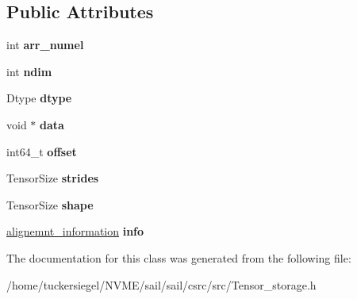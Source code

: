 \subsection*{Public Attributes}
\begin{DoxyCompactItemize}
\item 
\mbox{\label{classTensorStorage_a1288f01bbdaa9f55e685acc2df76b364}} 
int {\bfseries arr\+\_\+numel}
\item 
\mbox{\label{classTensorStorage_ac18d1ac2fe325bc1ae3bc988cb9058c2}} 
int {\bfseries ndim}
\item 
\mbox{\label{classTensorStorage_a20ff45e34fbaa71b705f48b0706d1898}} 
Dtype {\bfseries dtype}
\item 
\mbox{\label{classTensorStorage_a175bc84e9fef71edb10e9e8a7473ac82}} 
void $\ast$ {\bfseries data}
\item 
\mbox{\label{classTensorStorage_a82acc1fa796de34ac62930be0e3e1c99}} 
int64\+\_\+t {\bfseries offset}
\item 
\mbox{\label{classTensorStorage_a9d62e01a2163a8c4d4efbfc2b9e1076f}} 
Tensor\+Size {\bfseries strides}
\item 
\mbox{\label{classTensorStorage_a547b231dcfbc9c679860661a4e2291f6}} 
Tensor\+Size {\bfseries shape}
\item 
\mbox{\label{classTensorStorage_a6d31da541697683ab7505bf42542d544}} 
\hyperlink{structalignemnt__information}{alignemnt\+\_\+information} {\bfseries info}
\end{DoxyCompactItemize}


The documentation for this class was generated from the following file\+:\begin{DoxyCompactItemize}
\item 
/home/tuckersiegel/\+N\+V\+M\+E/sail/sail/csrc/src/Tensor\+\_\+storage.\+h\end{DoxyCompactItemize}
